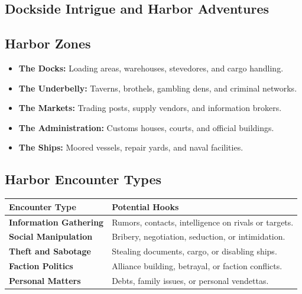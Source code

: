 \documentclass[11pt,oneside]{book}
\begin{document}
\begin{itemize}
\section{Dockside Intrigue and Harbor Adventures}

\subsection*{Harbor Zones}
\begin{itemize}
  \item \textbf{The Docks:} Loading areas, warehouses, stevedores, and cargo handling.
  \item \textbf{The Underbelly:} Taverns, brothels, gambling dens, and criminal networks.
  \item \textbf{The Markets:} Trading posts, supply vendors, and information brokers.
  \item \textbf{The Administration:} Customs houses, courts, and official buildings.
  \item \textbf{The Ships:} Moored vessels, repair yards, and naval facilities.
\end{itemize}

\subsection*{Harbor Encounter Types}
\begin{tabularx}{\linewidth}{@{}p{3.2cm} X@{}}
\toprule
\textbf{Encounter Type} & \textbf{Potential Hooks}\\
\midrule
\textbf{Information Gathering} & Rumors, contacts, intelligence on rivals or targets.\\
\textbf{Social Manipulation} & Bribery, negotiation, seduction, or intimidation.\\
\textbf{Theft and Sabotage} & Stealing documents, cargo, or disabling ships.\\
\textbf{Faction Politics} & Alliance building, betrayal, or faction conflicts.\\
\textbf{Personal Matters} & Debts, family issues, or personal vendettas.\\
\bottomrule
\end{tabularx}


\end{itemize}
\end{document}
